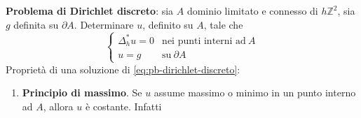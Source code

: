 \documentclass[10pt,a4paper,twoside,openright]{book}
\begin{document}
\textbf{Problema di Dirichlet discreto}: sia $\displaystyle A$ dominio limitato e connesso di $\displaystyle h\mathbb{Z}^{2}$, sia $\displaystyle g$ definita su $\displaystyle \partial A$. Determinare $\displaystyle u$, definito su $\displaystyle A$, tale che
\begin{equation}
	\begin{cases}
		\Delta ^{*}_{h} u=0 & \text{nei punti interni ad} \ A \\
		u=g                 & \text{su} \ \partial A          
	\end{cases}
	\label{eq:pb-dirichlet-discreto}
\end{equation}
Proprietà di una soluzione di \eqref{eq:pb-dirichlet-discreto}:
\begin{enumerate}
	\item \textbf{Principio di massimo}. Se $u$ assume massimo o minimo in un punto interno ad $A$, allora $u$ è costante. Infatti
		\begin{figure}[htpb]
	      	\centering

	      	\begin{tikzpicture}[x=0.75pt,y=0.75pt,yscale=-1,xscale=1]


\end{tikzpicture}
\end{figure}
\end{enumerate}
\end{document}
